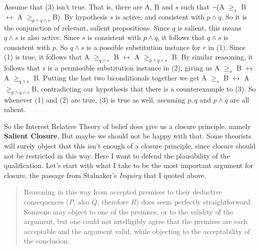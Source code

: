 \noindent Assume that (3) isn't true. That is, there are A, B and \(s\) such that \(\neg\)(A \(\geq_s\) B \(\leftrightarrow\) A \(\geq _{p \wedge q \wedge s}\)B). By hypothesis \(s\) is active, and consistent with \(p \wedge q\). So it is the conjunction of relevant, salient propositions. Since \(q\) is salient, this means \(q \wedge s\) is also active. Since \(s\) is consistent with \(p \wedge q\), it follows that \(q \wedge s\) is consistent with \(p\). So \(q \wedge s\) is a possible substitution instance for \(r\) in (1). Since (1) is true, it follows that A \(\geq _{q \wedge s}\) B \(\leftrightarrow\) A \(\geq _{p \wedge q \wedge s}\) B. By similar reasoning, it follows that \(s\) is a permissible substitution instance in (2), giving us A \(\geq_s\) B \(\leftrightarrow\) A \(\geq _{q \wedge s}\) B. Putting the last two biconditionals together we get A \(\geq_s\) B \(\leftrightarrow\) A \(\geq _{p \wedge q \wedge s}\)B, contradicting our hypothesis that there is a counterexample to (3). So whenever (1) and (2) are true, (3) is true as well, assuming \(p, q\) and \(p \wedge q\) are all salient.

So the Interest Relative Theory of belief does give us a closure principle, namely \textbf{Salient Closure}. But maybe we should not be happy with that. Some theorists will surely object that this isn't enough of a closure principle, since closure should not be restricted in this way. Here I want to defend the plausibility of the qualification. Let's start with what I take to be the most important argument for closure, the passage from Stalnaker's \textit{Inquiry} that I quoted above.

\begin{quote}
Reasoning in this way from accepted premises to their deductive consequences (\(P\), also \(Q\), therefore \(R\)) does seem perfectly straightforward. Someone may object to one of the premises, or to the validity of the argument, but one could not intelligibly agree that the premises are each acceptable and the argument valid, while objecting to the acceptability of the conclusion. \cite[92]{Stalnaker1984}
\end{quote}

